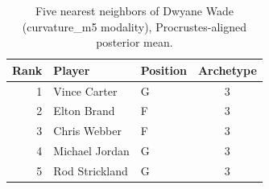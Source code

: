 \begin{table}[htbp]
  \centering\small
  \begin{tabular}{rllc}
    \toprule
    Rank & Player & Position & Archetype \\
    \midrule
    1 & Vince Carter & G & 3 \\
    2 & Elton Brand & F & 3 \\
    3 & Chris Webber & F & 3 \\
    4 & Michael Jordan & G & 3 \\
    5 & Rod Strickland & G & 3 \\
    \bottomrule
  \end{tabular}
  \caption{Five nearest neighbors of Dwyane Wade (curvature_m5 modality), Procrustes-aligned posterior mean.}
  \label{tab:Dwyane_Wade_neighbors_curvature_m5}
\end{table}

